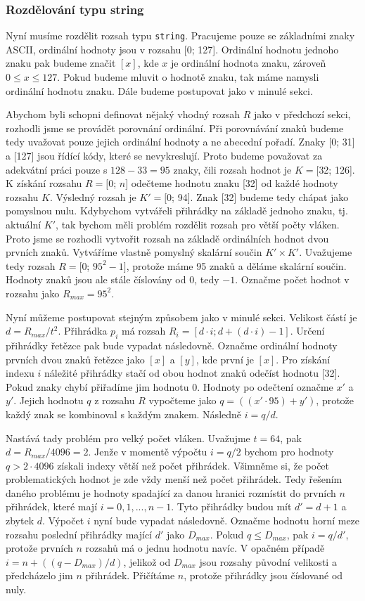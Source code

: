 \subsubsection{Rozdělování typu string}

Nyní musíme rozdělit rozsah typu \texttt{string}.
Pracujeme pouze se základními znaky ASCII, ordinální hodnoty jsou v rozsahu [0; 127].
Ordinální hodnotu jednoho znaku pak budeme značit $[x]$, kde $x$ je ordinální hodnota znaku, zároveň $0\leq x\leq 127$.
Pokud budeme mluvit o hodnotě znaku, tak máme namysli ordinální hodnotu znaku.
Dále budeme postupovat jako v minulé sekci.

Abychom byli schopni definovat nějaký vhodný rozsah $R$ jako v předchozí sekci, rozhodli jsme se provádět porovnání ordinální.
Při porovnávání znaků budeme tedy uvažovat pouze jejich ordinální hodnoty a ne abecední pořadí.
Znaky [0; 31] a [127] jsou řídící kódy, které se nevykreslují.
Proto budeme považovat za adekvátní práci pouze s $128-33=95$ znaky, čili rozsah hodnot je $K=[$32; 126].
K získání rozsahu $R=[$0; $n$] odečteme hodnotu znaku [32] od každé hodnoty rozsahu $K$.
Výsledný rozsah je  $K'=[$0; 94].
Znak [32] budeme tedy chápat jako pomyslnou nulu.
Kdybychom vytvářeli přihrádky na základě jednoho znaku, tj. aktuální $K'$, tak bychom měli problém rozdělit rozsah pro větší počty vláken.
Proto jsme se rozhodli vytvořit rozsah na základě ordinálních hodnot dvou prvních znaků.
Vytváříme vlastně pomyslný skalární součin $K' \times K'$.
Uvažujeme tedy rozsah $R=[$0; $95^2-1]$, protože máme 95 znaků a děláme skalární součin.
Hodnoty znaků jsou ale stále číslovány od 0, tedy $-1$.
Označme počet hodnot v rozsahu jako $R_{max}=95^2$.

Nyní můžeme postupovat stejným způsobem jako v minulé sekci.
Velikost částí je $d=R_{max}/t^2$.
Přihrádka $p_i$ má rozsah $R_i=[d \cdot i; d+(d \cdot i)-1]$.
Určení přihrádky řetězce pak bude vypadat následovně.
Označme ordinální hodnoty prvních dvou znaků řetězce jako $[x]$ a $[y]$, kde první je $[x]$.
Pro získání indexu $i$ náležité přihrádky stačí od obou hodnot znaků odečíst hodnotu [32].
Pokud znaky chybí přiřadíme jim hodnotu 0.  
Hodnoty po odečtení označme $x'$ a $y'$.
Jejich hodnotu $q$ z rozsahu $R$ vypočteme jako $q=((x' \cdot 95)+y')$, protože každý znak se kombinoval s každým znakem.
Následně $i=q/d$.

Nastává tady problém pro velký počet vláken.
Uvažujme $t=64$, pak $d=R_{max}/4096=2$.
Jenže v momentě výpočtu $i=q/2$ bychom pro hodnoty $q>2 \cdot 4096$ získali indexy větší než počet přihrádek.  
Všimněme si, že počet problematických hodnot je zde vždy menší než počet přihrádek.
Tedy řešením daného problému je hodnoty spadající za danou hranici rozmístit do prvních $n$ přihrádek, které mají $i=0, 1, ..., n-1$.
Tyto přihrádky budou mít $d'=d+1$ a zbytek $d$.
Výpočet $i$ nyní bude vypadat následovně.
Označme hodnotu horní meze rozsahu poslední přihrádky mající $d'$ jako $D_{max}$.
Pokud $q\leq D_{max}$, pak $i=q/d'$, protože prvních $n$ rozsahů má o jednu hodnotu navíc.
V opačném případě $i=n+((q-D_{max})/d)$, jelikož od $D_{max}$ jsou rozsahy původní velikosti a předcházelo jim $n$ přihrádek.
Přičítáme $n$, protože přihrádky jsou číslované od nuly.

